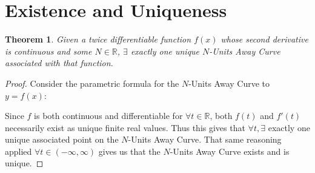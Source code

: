 \newtheorem{theorem}{Theorem}

\section{Existence and Uniqueness}

\begin{theorem}

  Given a twice differentiable function $f(x)$ whose second derivative is continuous and some $N \in \mathbb{R}$, $\exists$ exactly one unique $N$-Units Away Curve associated with that function.

\end{theorem}

\begin{proof}

  Consider the parametric formula for the $N$-Units Away Curve to $y = f(x)$: \firstFormula

  Since $f$ is both continuous and differentiable for $\forall t \in \mathbb{R}$, both $f(t)$ and $f'(t)$ necessarily exist as unique finite real values. Thus this gives that $\forall t, \exists$ exactly
  one unique associated point on the $N$-Units Away Curve. That same reasoning applied $\forall t \in (- \infty, \infty)$ gives us that the $N$-Units Away Curve exists and is unique.

\end{proof}
